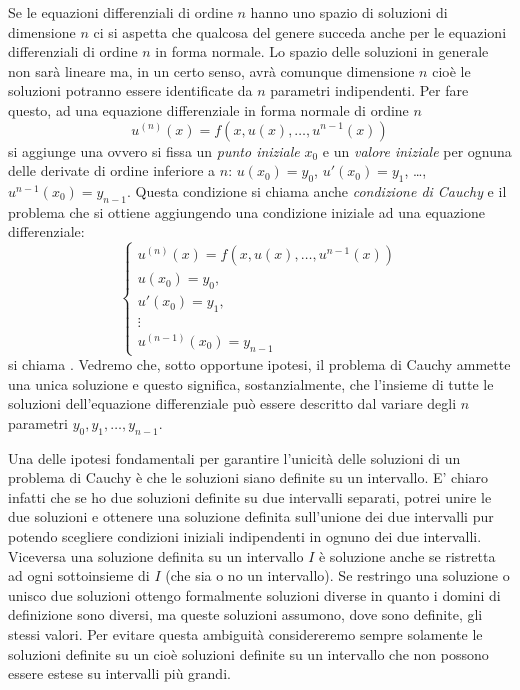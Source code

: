 Se le equazioni differenziali di ordine $n$ hanno uno spazio di
soluzioni di
dimensione $n$ ci si aspetta che qualcosa del genere succeda anche
per le equazioni differenziali di ordine $n$ in forma normale.
Lo spazio delle soluzioni in generale non sarà lineare ma, in un certo senso,
avrà comunque dimensione $n$ cioè le soluzioni potranno essere identificate
da $n$ parametri indipendenti.
Per fare questo, ad una equazione differenziale in forma normale
di ordine $n$
\[
u^{(n)}(x) = f(x, u(x), \dots, u^{n-1}(x))
\]
si aggiunge una  ovvero si fissa un
\emph{punto iniziale} $x_0$ e un \emph{valore iniziale}
per ognuna delle derivate di ordine inferiore a $n$:
$u(x_0) = y_0$, $u'(x_0)=y_1$, \dots, $u^{n-1}(x_0) = y_{n-1}$.
Questa condizione
si chiama anche \emph{condizione di Cauchy} e il problema
che si ottiene aggiungendo una condizione iniziale ad una
equazione differenziale:
\[
  \begin{cases}
  u^{(n)}(x) = f(x, u(x), \dots, u^{n-1}(x))\\
  u(x_0) = y_0, \\
  u'(x_0) = y_1, \\
  \vdots\\
  u^{(n-1)}(x_0) = y_{n-1}
  \end{cases}
\]
si chiama .
Vedremo che, sotto opportune ipotesi, il problema di Cauchy
ammette una unica soluzione e questo significa, sostanzialmente,
che l'insieme di tutte le soluzioni dell'equazione differenziale
può essere descritto dal variare
degli $n$ parametri $y_0, y_1, \dots, y_{n-1}$.

Una delle ipotesi fondamentali per garantire l'unicità delle
soluzioni di un problema di Cauchy è che le soluzioni siano
definite su un intervallo. E' chiaro infatti che se ho due
soluzioni definite su due intervalli separati, potrei unire
le due soluzioni e ottenere una soluzione definita sull'unione dei
due intervalli pur potendo scegliere condizioni iniziali 
indipendenti in ognuno dei due intervalli. 
Viceversa una soluzione definita
su un intervallo $I$ è soluzione anche se ristretta ad ogni sottoinsieme
di $I$ (che sia o no un intervallo).
Se restringo una soluzione o unisco due soluzioni ottengo formalmente
soluzioni diverse in quanto i domini di definizione sono diversi, ma
queste soluzioni assumono, dove sono definite, gli stessi valori.
Per evitare questa ambiguità considereremo sempre solamente
le soluzioni definite su un  cioè
soluzioni definite su un intervallo che non possono essere
estese su intervalli più grandi.


